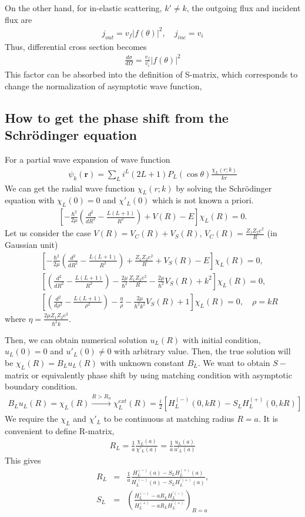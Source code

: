 \documentclass[10pt]{book}
\def\bm{\boldsymbol}
\newcommand{\bea}{\begin{eqnarray}}
\newcommand{\eea}{\end{eqnarray}}
\newcommand{\no}{\nonumber \\}
\def\vr{{\bm r}}
\begin{document}
On the other hand, for in-elastic scattering, $k'\neq k$, the outgoing flux and incident flux are
\bea 
j_{out}= v_f |f(\theta)|^2, \quad j_{inc}= v_i 
\eea 
Thus, differential cross section becomes 
\bea 
\frac{d\sigma}{d\Omega}=\frac{v_f}{v_i}|f(\theta)|^2 
\eea 
This factor can be absorbed into the definition of S-matrix, which corresponds to change the normalization of
asymptotic wave function,

\subsection{How to get the phase shift from the Schr\"{o}dinger equation} 
For a partial wave expansion of wave function
\bea 
\psi_k(\vr)=\sum_{L} i^L (2L+1) P_L(\cos\theta)\frac{\chi_L(r;k)}{kr}
\eea 
We can get the radial wave function $\chi_L(r;k)$ by solving the  
Schr\"{o}dinger equation with $\chi_L(0)=0$ and $\chi'_L(0)$ which is not known
a priori. 
\bea 
\left[-\frac{\hbar^2}{2\mu}\left( \frac{d^2}{dR^2}-\frac{L(L+1)}{R^2}\right)
    +V(R)-E\right]\chi_L(R)=0.
\eea 
Let us consider the case $V(R)=V_C(R)+V_S(R)$, $V_C(R)=\frac{Z_1Z_2 e^2}{R}$
(in Gaussian unit)
\bea 
& &\left[-\frac{\hbar^2}{2\mu}\left( \frac{d^2}{dR^2}-\frac{L(L+1)}{R^2}\right)
    +\frac{Z_1Z_2 e^2}{R}+V_S(R)-E\right]\chi_L(R)=0,\no 
& &\left[\left( \frac{d^2}{dR^2}-\frac{L(L+1)}{R^2}\right)
    -\frac{2\mu}{\hbar^2}\frac{Z_1Z_2 e^2}{R}-\frac{2\mu}{\hbar^2}V_S(R)+k^2 \right]\chi_L(R)=0,\no 
& & \left[\left( \frac{d^2}{d \rho^2}-\frac{L(L+1)}{\rho^2}\right)
    -\frac{\eta}{\rho }-\frac{2\mu}{\hbar^2 k^2}V_S(R)+1 \right]\chi_L(R)=0, \quad \rho=kR       
\eea 
where $\eta=\frac{2\mu Z_1Z_2 e^2}{\hbar^2 k}$.

Then, we can obtain numerical solution $u_L(R)$ with initial condition,
$u_L(0)=0$ and $u'_L(0)\neq 0$ with arbitrary value. Then, the true solution
will be $\chi_L(R)=B_L u_L(R)$ with unknown constant $B_L$. 
We want to obtain $S-$matrix or equivalently phase shift by using matching 
condition with asymptotic boundary condition.
\bea 
B_L u_L(R)=\chi_L(R) \xrightarrow{R>R_n} 
\chi_L^{ext}(R)=\frac{i}{2}\left[H_L^{(-)}(0,kR)-S_L H_L^{(+)}(0,kR)\right]  
\eea 
We require the $\chi_L$ and $\chi'_L$ to be continuous at matching radius $R=a$. 
It is convenient to define R-matrix,
\bea 
R_L=\frac{1}{a}\frac{\chi_L(a)}{\chi'_L(a)}=\frac{1}{a}\frac{u_L(a)}{u'_L(a)}
\eea 
This gives
\bea 
R_L&=&\frac{1}{a}\frac{H_L^{(-)}(a)-S_L H_L^{(+)}(a)}{H_L^{'(-)}(a)-S_L H_L^{'(+)}(a)},\no 
S_L&=&\left(\frac{H_L^{(-)}-a R_L H_L^{'(-)}}{H_L^{(+)}-a R_L H_L^{'(+)}}\right)_{R=a}
\eea 
\end{document}
